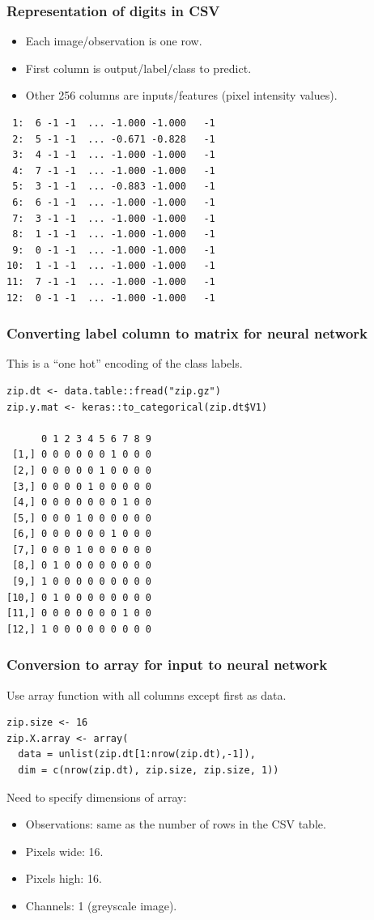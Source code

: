 \documentclass{beamer}
\begin{document}
\begin{frame}[fragile]
  \frametitle{Representation of digits in CSV}

  \begin{itemize}
  \item Each image/observation is one row.
  \item First column is output/label/class to predict.
  \item Other 256 columns are inputs/features (pixel intensity
    values).
  \end{itemize}

\begin{verbatim}
 1:  6 -1 -1  ... -1.000 -1.000   -1
 2:  5 -1 -1  ... -0.671 -0.828   -1
 3:  4 -1 -1  ... -1.000 -1.000   -1
 4:  7 -1 -1  ... -1.000 -1.000   -1
 5:  3 -1 -1  ... -0.883 -1.000   -1
 6:  6 -1 -1  ... -1.000 -1.000   -1
 7:  3 -1 -1  ... -1.000 -1.000   -1
 8:  1 -1 -1  ... -1.000 -1.000   -1
 9:  0 -1 -1  ... -1.000 -1.000   -1
10:  1 -1 -1  ... -1.000 -1.000   -1
11:  7 -1 -1  ... -1.000 -1.000   -1
12:  0 -1 -1  ... -1.000 -1.000   -1
\end{verbatim}
  
\end{frame}

\begin{frame}[fragile]
  \frametitle{Converting label column to matrix for neural network}

  This is a ``one hot'' encoding of the class labels.
  
\begin{verbatim}
zip.dt <- data.table::fread("zip.gz")
zip.y.mat <- keras::to_categorical(zip.dt$V1)

      0 1 2 3 4 5 6 7 8 9
 [1,] 0 0 0 0 0 0 1 0 0 0
 [2,] 0 0 0 0 0 1 0 0 0 0
 [3,] 0 0 0 0 1 0 0 0 0 0
 [4,] 0 0 0 0 0 0 0 1 0 0
 [5,] 0 0 0 1 0 0 0 0 0 0
 [6,] 0 0 0 0 0 0 1 0 0 0
 [7,] 0 0 0 1 0 0 0 0 0 0
 [8,] 0 1 0 0 0 0 0 0 0 0
 [9,] 1 0 0 0 0 0 0 0 0 0
[10,] 0 1 0 0 0 0 0 0 0 0
[11,] 0 0 0 0 0 0 0 1 0 0
[12,] 1 0 0 0 0 0 0 0 0 0
\end{verbatim}


\end{frame}

\begin{frame}[fragile]
  \frametitle{Conversion to array for input to neural network}
Use array function with all columns except first as data.  
\begin{verbatim}
zip.size <- 16
zip.X.array <- array(
  data = unlist(zip.dt[1:nrow(zip.dt),-1]),
  dim = c(nrow(zip.dt), zip.size, zip.size, 1))
\end{verbatim}
Need to specify dimensions of array:
\begin{itemize}
\item Observations: same as the number of rows in the CSV table.
\item Pixels wide: 16.
\item Pixels high: 16.
\item Channels: 1 (greyscale image).
\end{itemize}

\end{frame}
\end{document}
